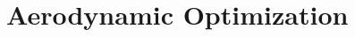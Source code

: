 \section{Aerodynamic Optimization}

\def\incrabsvars{\Delta \absvars}
\def\incrlagmultsneq{\Delta \lagmultsneq}
\def\incrlagmultseq{\Delta \lagmultseq}

\def\PPLagfuncBYabsvars{\ppdfrac{\Lagfunc}{\absvars}}
\def\PLagfuncBYabsvars{\pdfrac{\Lagfunc}{\absvars}}
\def\PneqctrBYabsvars{\pdfrac{\neqctr}{\absvar}}
\def\PeqctrBYabsvars{\pdfrac{\eqctr}{\absvar}}

\def\DoptcritJBYabsvarI{\frac{d \optcrit_{j}}{d \absvar_{i}}}
\def\PoptcritJBYabsvarI{\pdfrac{\optcrit_{j}}{\absvar_{i}}}

\def\PoptcritJBYstructdisp{\pdfrac{\optcrit_{j}}{\structdisp}}
\def\PoptcritJBYmms       {\pdfrac{\optcrit_{j}}{\mms}}
\def\PoptcritJBYfstate    {\pdfrac{\optcrit_{j}}{\fstate}}

\def\DoptcritJBYstructdisp{\tfrac{\optcrit_{j}}{\structdisp}}
\def\DoptcritJBYmms       {\tfrac{\optcrit_{j}}{\mms}}
\def\DoptcritJBYfstate    {\tfrac{\optcrit_{j}}{\fstate}}

\def\DstructdispBYabsvarI{\frac{d \structdisp}{d \absvar_{i}} }
\def\DmmsBYabsvarI       {\frac{d \mms       }{d \absvar_{i}} }
\def\DfstateBYabsvarI    {\frac{d \fstate    }{d \absvar_{i}} }

\def\PstructdispBYabsvarI{\pdfrac{d \structdisp}{d \absvar_{i}} }
\def\PmmsBYabsvarI       {\pdfrac{d \mms       }{d \absvar_{i}} }
\def\PfstateBYabsvarI    {\pdfrac{d \fstate    }{d \absvar_{i}} }

\def\PEOSstructBYabsvarI{\pdfrac{\EOSstruct} {\absvar_i}}
\def\PEOSmeshBYabsvarI  {\pdfrac{\EOSmesh}  {\absvar_i}}

\def\DEOSstructBYabsvarI{\tfrac{\EOSstruct} {\absvar_i}}
\def\DEOSmeshBYabsvarI  {\tfrac{\EOSmesh}  {\absvar_i}}

\def\PEOSstructBYstructdisp{\pdfrac{\EOSstruct} {\structdisp}}
\def\PEOSstructBYmms{\pdfrac{\EOSstruct}{\mms}}
\def\PEOSstructBYfstate    {\pdfrac{\EOSstruct}{\fstate}}

\def\PEOSmeshBYstructdisp{\pdfrac{\EOSmesh}{\structdisp}}
\def\PEOSmeshBYmms       {\pdfrac{\EOSmesh} {\mms}}
\def\PEOSmeshBYfstate    {\vec{0}}

\def\PEOSfluidBYstructdisp{\vec{0}}

